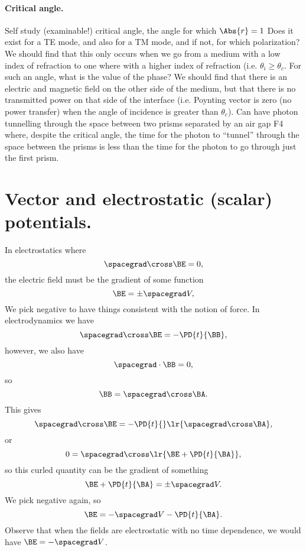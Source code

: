 \paragraph{Critical angle.}
%
Self study (examinable!) critical angle, the angle for which \( \Abs{r} = 1 \)
%
Does it exist for a TE mode, and also for a TM mode, and if not, for which polarization?
%
We should find that this only occurs when we go from a medium with a low index of refraction to one where with a higher index of refraction (i.e. \( \theta_i \ge \theta_c \).
%
For such an angle, what is the value of the phase?
%
We should find that there is an electric and magnetic field on the other side of the medium, but that there is no transmitted power on that side of the interface (i.e. Poynting vector is zero (no power transfer) when the angle of incidence is greater than \( \theta_c \)).
%
Can have photon tunnelling through the space between two prisms separated by an air gap
%
F4
%
where, despite the critical angle, the time for the photon to ``tunnel'' through the space between the prisms is less than the time for the photon to go through just the first prism.
%
\section{Vector and electrostatic (scalar) potentials.}
%
In electrostatics where
\begin{dmath}\label{eqn:emtLecture10:720}
\spacegrad \cross \BE  = 0,
\end{dmath}
%
the electric field must be the gradient of some function
\begin{dmath}\label{eqn:emtLecture10:740}
\BE = \pm \spacegrad V,
\end{dmath}
%
We pick negative to have things consistent with the notion of force.
%
In electrodynamics we have
\begin{dmath}\label{eqn:emtLecture10:760}
\spacegrad \cross \BE = - \PD{t}{\BB},
\end{dmath}
%
however, we also have
%
\begin{dmath}\label{eqn:emtLecture10:780}
\spacegrad \cdot \BB = 0,
\end{dmath}
%
so
\begin{dmath}\label{eqn:emtLecture10:800}
   \BB = \spacegrad \cross \BA.
\end{dmath}
%
This gives
\begin{dmath}\label{eqn:emtLecture10:820}
   \spacegrad \cross \BE = - \PD{t}{} \lr{ \spacegrad \cross \BA },
\end{dmath}
%
or
\begin{dmath}\label{eqn:emtLecture10:840}
0 =
\spacegrad \cross \lr{ \BE + \PD{t}{\BA} },
\end{dmath}
%
so this curled quantity can be the gradient of something
%
\begin{dmath}\label{eqn:emtLecture10:860}
\BE + \PD{t}{\BA} = \pm \spacegrad V.
\end{dmath}
%
We pick negative again, so
%
\begin{dmath}\label{eqn:emtLecture10:880}
\BE = -\spacegrad V -\PD{t}{\BA}.
\end{dmath}
%
Observe that when the fields are electrostatic with no time dependence, we would have \( \BE = -\spacegrad V \).
%
%
\EndNoBibArticle
